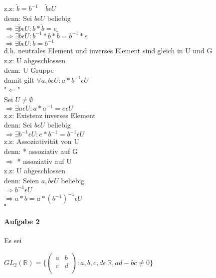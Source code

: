 \documentclass[paper=a4, fontsize=11pt]{scrartcl}
\numberwithin{equation}{section}
\numberwithin{figure}{section}
\numberwithin{table}{section}
\begin{document}
z.z: $\tilde{b}=b^{-1} \quad \tilde{b} \epsilon U$ \\
denn: Sei $b \epsilon U$ beliebig \\
$\Rightarrow \exists \tilde{b} \epsilon U : b*\tilde{b} = e$ \\
$\Rightarrow \exists \tilde{b} \epsilon U : b^{-1}*b*\tilde{b} = b^{-1}*e$ \\
$\Rightarrow \exists \tilde{b} \epsilon U : \tilde{b} = b^{-1}$ \\

d.h. neutrales Element und inverses Element sind gleich in U und G\\

z.z: U abgeschlossen \\
denn: U Gruppe \\
damit gilt $\forall a,b \epsilon U: a*b^{-1} \epsilon U$ \\

"$\Leftarrow$" \\
Sei $U \neq \emptyset$ \\
$\Rightarrow \exists a \epsilon U: a*a^{-1} = e \epsilon U$ \\

z.z: Existenz inverses Element \\
denn: Sei $b \epsilon U$ beliebig \\
$\Rightarrow \exists b^{-1} \epsilon U: e*b^{-1} = b^{-1} \epsilon U$ \\

z.z: Assoziativität von U \\
denn: * assoziativ auf G\\
$\Rightarrow$ * assoziativ auf U \\

z.z: U abgeschlossen \\
denn: Seien $a,b \epsilon U$ beliebig \\
$\Rightarrow b^{-1} \epsilon U$ \\
$\Rightarrow a*b = a*(b^{-1})^{-1} \epsilon U$ \\

\hfill $\square$


\paragraph{Aufgabe 2}

Es sei 

\begin{center}
$GL_{2}(\mathbb{R}) = \Biggl \lbrace
\begin{pmatrix}
a & b  \\
c & d  \\
\end{pmatrix} 
: a, b, c, d  \epsilon \: \mathbb{R}, ad - bc \neq 0 \rbrace$ 
\end{center}
\end{document}
